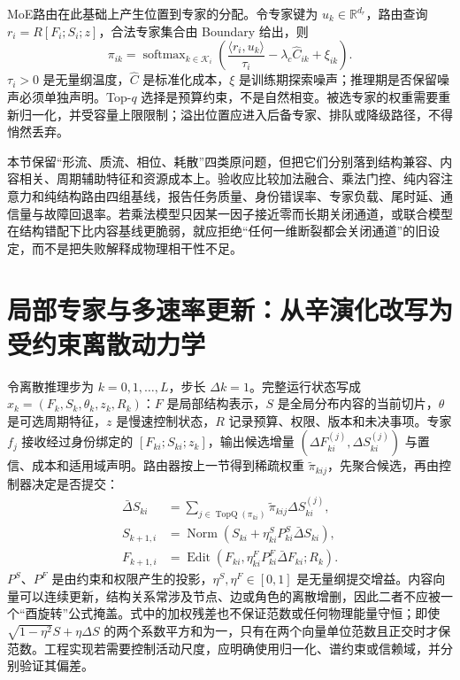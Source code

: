MoE路由在此基础上产生位置到专家的分配。令专家键为 $u_k\in\mathbb{R}^{d_r}$，路由查询 $r_i=R[F_i;S_i;z]$，合法专家集合由 Boundary 给出，则
\begin{equation}
\pi_{ik}=\operatorname{softmax}_{k\in\mathcal K_i}
\left(\frac{\langle r_i,u_k\rangle}{\tau_i}-\lambda_c\widehat C_{ik}+\xi_{ik}\right).
\end{equation}
$\tau_i>0$ 是无量纲温度，$\widehat C$ 是标准化成本，$\xi$ 是训练期探索噪声；推理期是否保留噪声必须单独声明。Top-$q$ 选择是预算约束，不是自然相变。被选专家的权重需要重新归一化，并受容量上限限制；溢出位置应进入后备专家、排队或降级路径，不得悄然丢弃。

本节保留“形流、质流、相位、耗散”四类原问题，但把它们分别落到结构兼容、内容相关、周期辅助特征和资源成本上。验收应比较加法融合、乘法门控、纯内容注意力和纯结构路由四组基线，报告任务质量、身份错误率、专家负载、尾时延、通信量与故障回退率。若乘法模型只因某一因子接近零而长期关闭通道，或联合模型在结构错配下比内容基线更脆弱，就应拒绝“任何一维断裂都会关闭通道”的旧设定，而不是把失败解释成物理相干性不足。

\section{局部专家与多速率更新：从辛演化改写为受约束离散动力学}
\label{sec:appendix_symplectic_evolution}

令离散推理步为 $k=0,1,\ldots,L$，步长 $\Delta k=1$。完整运行状态写成 $x_k=(F_k,S_k,\theta_k,z_k,R_k)$：$F$ 是局部结构表示，$S$ 是全局分布内容的当前切片，$\theta$ 是可选周期特征，$z$ 是慢速控制状态，$R$ 记录预算、权限、版本和未决事项。专家 $f_j$ 接收经过身份绑定的 $[F_{ki};S_{ki};z_k]$，输出候选增量 $(\Delta F^{(j)}_{ki},\Delta S^{(j)}_{ki})$ 与置信、成本和适用域声明。路由器按上一节得到稀疏权重 $\widetilde\pi_{kij}$，先聚合候选，再由控制器决定是否提交：
\begin{align}
\bar\Delta S_{ki}&=\sum_{j\in\operatorname{TopQ}(\pi_{ki})}\widetilde\pi_{kij}\Delta S^{(j)}_{ki},\\
S_{k+1,i}&=\operatorname{Norm}\!\left(S_{ki}+\eta^S_{ki}P^S_{ki}\bar\Delta S_{ki}\right),\\
F_{k+1,i}&=\operatorname{Edit}\!\left(F_{ki},\eta^F_{ki}P^F_{ki}\bar\Delta F_{ki};R_k\right).
\end{align}
$P^S$、$P^F$ 是由约束和权限产生的投影，$\eta^S,\eta^F\in[0,1]$ 是无量纲提交增益。内容向量可以连续更新，结构关系常涉及节点、边或角色的离散增删，因此二者不应被一个“酉旋转”公式掩盖。式中的加权残差也不保证范数或任何物理能量守恒；即使 $\sqrt{1-\eta^2}S+\eta\Delta S$ 的两个系数平方和为一，只有在两个向量单位范数且正交时才保范数。工程实现若需要控制活动尺度，应明确使用归一化、谱约束或信赖域，并分别验证其偏差。

